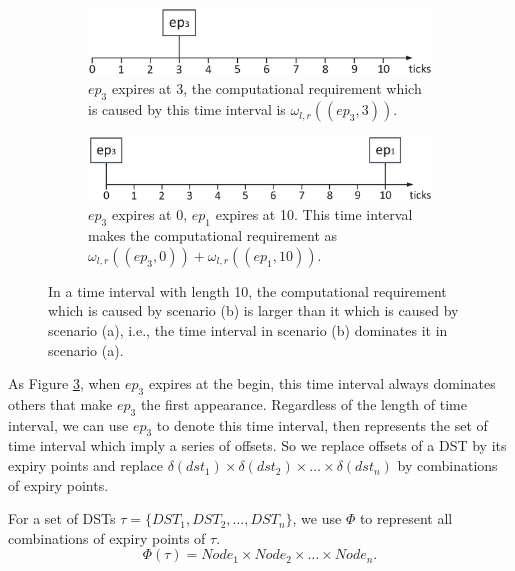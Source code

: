 \documentclass[sigconf]{acmart}
\begin{document}
\begin{figure}  
  \centering
  \begin{subfigure}[t]{3.33in}
    \centering
    \includegraphics[scale=.333]{graphics/figure_combina1.eps}
    \caption{$ep_3$ expires at 3, the computational requirement which is caused by this time interval is $\omega_{l,r}((ep_3,3)).$}\label{figure_combination1}
  \end{subfigure}
  \quad
  \begin{subfigure}[t]{3.33in}
    \centering
    \includegraphics[scale=.333]{graphics/figure_combina2.eps}
    \caption{$ep_3$ expires at 0, $ep_1$ expires at 10. This time interval makes the computational requirement as $\omega_{l,r}((ep_3,0))+\omega_{l,r}((ep_1,10))$.}\label{figure_combination2}
  \end{subfigure}
  \caption{In a time interval with length 10, the computational requirement which is caused by scenario (b) is larger than it which is caused by scenario (a), i.e., the time interval in scenario (b) dominates it in scenario (a).}\label{figure_combination}
\end{figure}
As Figure \ref{figure_combination}, when $ep_3$ expires at the begin, this time interval always dominates others that make $ep_3$ the first appearance. Regardless of the length of time interval, we can use $ep_3$ to denote this time interval, then represents the set of time interval which imply a series of offsets. So we replace offsets of a DST by its expiry points and replace $\delta(dst_1)\times\delta(dst_2)\times\dots\times\delta(dst_n)$ by combinations of expiry points.
\begin{definition}
For a set of DSTs $\tau=\{DST_1,DST_2,\dots,DST_n\}$, we use $\Phi$ to represent all combinations of expiry points of $\tau$.
\begin{equation}
  \Phi(\tau)=Node_1 \times Node_2\times\dots\times Node_n.
\end{equation}\label{equation_combination}
\end{definition}
\end{document}
